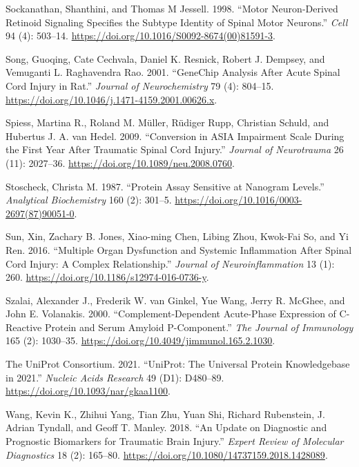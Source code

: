 \documentclass[9pt,lineno]{elife}
\newlength{\cslhangindent}
\newlength{\cslentryspacingunit} %
\newenvironment{CSLReferences}[2] %
 {%
  \setlength{\parindent}{0pt}
  \ifodd #1
  \let\oldpar\par
  \def\par{\hangindent=\cslhangindent\oldpar}
  \fi
  \setlength{\parskip}{#2\cslentryspacingunit}
 }%
 {}
\begin{document}
\begin{landscape}
\begin{landscape}
\begin{landscape}
\begin{landscape}
\begin{CSLReferences}{1}{0}
\leavevmode{}%
Sockanathan, Shanthini, and Thomas M Jessell. 1998. {``Motor {Neuron-Derived Retinoid Signaling Specifies} the {Subtype Identity} of {Spinal Motor Neurons}.''} \emph{Cell} 94 (4): 503--14. \url{https://doi.org/10.1016/S0092-8674(00)81591-3}.

\leavevmode{}%
Song, Guoqing, Cate Cechvala, Daniel K. Resnick, Robert J. Dempsey, and Vemuganti L. Raghavendra Rao. 2001. {``{GeneChip} Analysis After Acute Spinal Cord Injury in Rat.''} \emph{Journal of Neurochemistry} 79 (4): 804--15. \url{https://doi.org/10.1046/j.1471-4159.2001.00626.x}.

\leavevmode{}%
Spiess, Martina R., Roland M. Müller, Rüdiger Rupp, Christian Schuld, and Hubertus J. A. van Hedel. 2009. {``Conversion in {ASIA Impairment Scale} During the First Year After Traumatic Spinal Cord Injury.''} \emph{Journal of Neurotrauma} 26 (11): 2027--36. \url{https://doi.org/10.1089/neu.2008.0760}.

\leavevmode{}%
Stoscheck, Christa M. 1987. {``Protein Assay Sensitive at Nanogram Levels.''} \emph{Analytical Biochemistry} 160 (2): 301--5. \url{https://doi.org/10.1016/0003-2697(87)90051-0}.

\leavevmode{}%
Sun, Xin, Zachary B. Jones, Xiao-ming Chen, Libing Zhou, Kwok-Fai So, and Yi Ren. 2016. {``Multiple Organ Dysfunction and Systemic Inflammation After Spinal Cord Injury: A Complex Relationship.''} \emph{Journal of Neuroinflammation} 13 (1): 260. \url{https://doi.org/10.1186/s12974-016-0736-y}.

\leavevmode{}%
Szalai, Alexander J., Frederik W. van Ginkel, Yue Wang, Jerry R. McGhee, and John E. Volanakis. 2000. {``Complement-{Dependent Acute-Phase Expression} of {C-Reactive Protein} and {Serum Amyloid P-Component}.''} \emph{The Journal of Immunology} 165 (2): 1030--35. \url{https://doi.org/10.4049/jimmunol.165.2.1030}.

\leavevmode{}%
The UniProt Consortium. 2021. {``{UniProt}: The Universal Protein Knowledgebase in 2021.''} \emph{Nucleic Acids Research} 49 (D1): D480--89. \url{https://doi.org/10.1093/nar/gkaa1100}.

\leavevmode{}%
Wang, Kevin K., Zhihui Yang, Tian Zhu, Yuan Shi, Richard Rubenstein, J. Adrian Tyndall, and Geoff T. Manley. 2018. {``An Update on Diagnostic and Prognostic Biomarkers for Traumatic Brain Injury.''} \emph{Expert Review of Molecular Diagnostics} 18 (2): 165--80. \url{https://doi.org/10.1080/14737159.2018.1428089}.


\end{CSLReferences}
\end{landscape}
\end{landscape}
\end{landscape}
\end{landscape}
\end{document}
